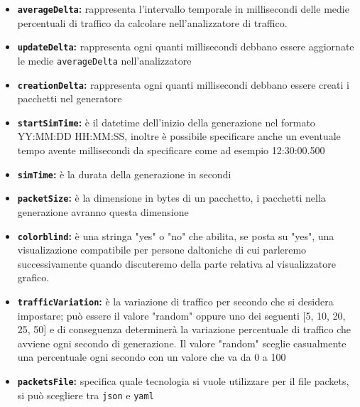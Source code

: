\documentclass[binding=0.6cm]{sapthesis}
\begin{document}
\begin{itemize}
    \item \textbf{\texttt{averageDelta}:} rappresenta l'intervallo temporale in millisecondi 
    delle medie percentuali di traffico da calcolare nell'analizzatore di traffico.
    \item \textbf{\texttt{updateDelta}:} rappresenta ogni quanti millisecondi debbano essere aggiornate le medie \texttt{averageDelta} nell'analizzatore
    \item \textbf{\texttt{creationDelta}:} rappresenta ogni quanti millisecondi debbano essere creati i pacchetti nel generatore
    \item \textbf{\texttt{startSimTime}:} è il datetime dell'inizio della generazione nel formato \newline
    YY:MM:DD HH:MM:SS, inoltre è possibile specificare anche un eventuale tempo avente millisecondi da specificare come ad esempio 
    12:30:00.500
    \item \textbf{\texttt{simTime}:} è la durata della generazione in secondi
    \item \textbf{\texttt{packetSize}:} è la dimensione in bytes di un pacchetto, i pacchetti nella generazione avranno questa dimensione
    \item \textbf{\texttt{colorblind}:} è una stringa "yes" o "no" che abilita, se posta su "yes", una visualizazione compatibile per persone daltoniche
    di cui parleremo successivamente quando discuteremo della parte relativa al visualizzatore grafico.
    \item \textbf{\texttt{trafficVariation}:} è la variazione di traffico per secondo che si desidera impostare; 
    può essere il valore "random" oppure uno dei seguenti [5, 10, 20, 25, 50] e 
    di conseguenza determinerà la variazione percentuale di traffico che avviene 
    ogni secondo di generazione. Il valore "random" sceglie casualmente una percentuale 
    ogni secondo con un valore che va da 0 a 100
    \item \textbf{\texttt{packetsFile}:} specifica quale tecnologia si vuole utilizzare per il file packets, 
    si può scegliere tra \texttt{json} e \texttt{yaml}
\end{itemize}
\end{document}
